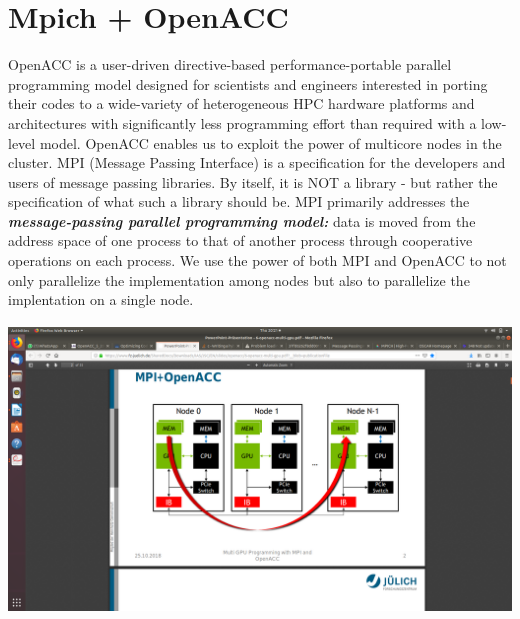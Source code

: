 \documentclass[a4paper]{article}
\begin{document}
\section{}
\section{}
\section[Mpich + OpenACC]{Mpich + OpenACC}
OpenACC is a user-driven directive-based performance-portable parallel programming model designed for scientists and
engineers interested in porting their codes to a wide-variety of heterogeneous HPC hardware platforms and architectures
with significantly less programming effort than required with a low-level model. OpenACC enables us to exploit the
power of multicore nodes in the cluster. MPI (Message Passing Interface) is a specification for the developers and
users of message passing libraries. By itself, it is NOT a library - but rather the specification of what such a
library should be. MPI primarily addresses the \textbf{\textit{message-passing parallel programming model:}} data is
moved from the address space of one process to that of another process through cooperative operations on each process.
We use the power of both MPI and OpenACC to not only parallelize the implementation among nodes but also to parallelize
the implentation on a single node.



\begin{center}
\includegraphics[width=14.631cm,height=7.689cm]{csn221Report-img001.png}
\end{center}

\bigskip
\end{document}
